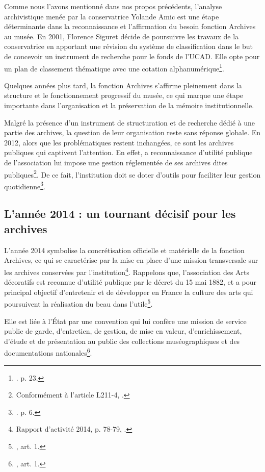 Comme nous l’avons mentionné dans nos propos précédents, l’analyse archivistique menée par  la conservatrice Yolande Amic est une étape déterminante dans la reconnaissance et l’affirmation du besoin fonction Archives au musée. En 2001, Florence Siguret décide de poursuivre les travaux de la conservatrice en apportant une révision du système de classification dans le but de concevoir un instrument de recherche pour le fonds de l’UCAD. Elle opte pour un plan de classement thématique avec une cotation alphanumérique\footnote{\cite{krezidou-2021}. p. 23.}.

Quelques années plus tard, la fonction Archives s’affirme pleinement dans la structure et le fonctionnement progressif du musée, ce qui marque une étape importante dans l’organisation et la préservation de la mémoire institutionnelle.

Malgré la présence d’un instrument de structuration et de recherche dédié à une partie des archives, la question de leur organisation reste sans réponse globale. En 2012, alors que les problématiques restent inchangées, ce sont les archives publiques qui captivent l’attention. En effet, a reconnaissance d’utilité publique de l’association lui impose une gestion réglementée de ses archives dites publiques\footnote{Conformément à l'article L211-4, \cite{code-patrimoine-legislative} .}. De ce fait, l'institution doit se doter d'outils pour faciliter leur gestion quotidienne\footnote{\cite{bauer-archives-publiques-2012}. p. 6.}.

\subsection*{L’année 2014 : un tournant décisif pour les archives}

L’année 2014 symbolise la concrétisation officielle et matérielle de la fonction Archives, ce qui se caractérise par la mise en place d’une mission transversale sur les archives conservées par l’institution\footnote{Rapport d’activité 2014, p. 78-79, \cite{JP801-rapports}.}. Rappelons que, l’association des Arts décoratifs est reconnue d’utilité publique par le décret du 15 mai 1882, et a pour principal objectif d’entretenir et de développer en France la culture des arts qui poursuivent la réalisation du beau dans l’utile\footnote{\cite{mad-statuts-2023}, art. 1.}.

Elle est liée à l’État par une convention qui lui confère une mission de service public de garde, d’entretien, de gestion, de mise en valeur, d’enrichissement, d’étude et de présentation au public des collections muséographiques et des documentations nationales\footnote{\cite{mad-statuts-2023}, art. 1.}.


